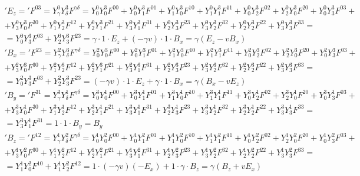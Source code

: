 \begin{gather*}
'E_z ='F^{03} = Y^0_\gamma Y^3_\delta F^{\gamma \delta} = Y^0_0 Y^3_0 F^{00}+Y^0_0 Y^3_1 F^{01}+Y^0_1 Y^3_0 F^{10}+Y^0_1 Y^3_1 F^{11}+Y^0_0 Y^3_2 F^{02}+Y^0_2 Y^3_0 F^{20}+Y^0_0 Y^3_3 F^{03}+\\+Y^0_3 Y^3_0 F^{30}+Y^0_1 Y^3_2 F^{12}+Y^0_2 Y^3_1 F^{21}+Y^0_3 Y^3_1 F^{31}+Y^0_2 Y^3_3 F^{23}+Y^0_3 Y^3_2 F^{32}+Y^0_2 Y^3_2 F^{22}+Y^0_3 Y^3_3 F^{33}=\\
=Y^0_0 Y^3_3 F^{03}+Y^0_2 Y^3_3 F^{23}=\gamma \cdot 1 \cdot E_z+(-\gamma v)\cdot 1 \cdot B_x = \gamma(E_z-vB_x)
\end{gather*}
\begin{gather*}
'B_x ='F^{23} = Y^2_\gamma Y^3_\delta F^{\gamma \delta} = Y^2_0 Y^3_0 F^{00}+Y^2_0 Y^3_1 F^{01}+Y^2_1 Y^3_0 F^{10}+Y^2_1 Y^3_1 F^{11}+Y^2_0 Y^3_2 F^{02}+Y^2_2 Y^3_0 F^{20}+Y^2_0 Y^3_3 F^{03}+\\+Y^2_3 Y^3_0 F^{30}+Y^2_1 Y^3_2 F^{12}+Y^2_2 Y^3_1 F^{21}+Y^2_3 Y^3_1 F^{31}+Y^2_2 Y^3_3 F^{23}+Y^2_3 Y^3_2 F^{32}+Y^2_2 Y^3_2 F^{22}+Y^2_3 Y^3_3 F^{33}=\\
=Y^2_0 Y^3_3 F^{03}+Y^2_2 Y^3_3 F^{23}=(-\gamma v)\cdot 1 \cdot E_z+\gamma \cdot 1 \cdot B_x=\gamma (B_x-vE_z)
\end{gather*}
\begin{gather*}
'B_y ='F^{31} = Y^3_\gamma Y^1_\delta F^{\gamma \delta} = Y^3_0 Y^1_0 F^{00}+Y^3_0 Y^1_1 F^{01}+Y^3_1 Y^1_0 F^{10}+Y^3_1 Y^1_1 F^{11}+Y^3_0 Y^1_2 F^{02}+Y^3_2 Y^1_0 F^{20}+Y^3_0 Y^1_3 F^{03}+\\+Y^3_3 Y^1_0 F^{30}+Y^3_1 Y^1_2 F^{12}+Y^3_2 Y^1_1 F^{21}+Y^3_3 Y^1_1 F^{31}+Y^3_2 Y^1_3 F^{23}+Y^3_3 Y^1_2 F^{32}+Y^3_2 Y^1_2 F^{22}+Y^3_3 Y^1_3 F^{33}=\\
=Y^3_3 Y^1_1 F^{31}=1\cdot 1 \cdot B_y= B_y
\end{gather*}
\begin{gather*}
'B_z ='F^{12} = Y^1_\gamma Y^2_\delta F^{\gamma \delta} = Y^1_0 Y^2_0 F^{00}+Y^1_0 Y^2_1 F^{01}+Y^1_1 Y^2_0 F^{10}+Y^1_1 Y^2_1 F^{11}+Y^1_0 Y^2_2 F^{02}+Y^1_2 Y^2_0 F^{20}+Y^1_0 Y^2_3 F^{03}+\\+Y^1_3 Y^2_0 F^{30}+Y^1_1 Y^2_2 F^{12}+Y^1_2 Y^2_1 F^{21}+Y^1_3 Y^2_1 F^{31}+Y^1_2 Y^2_3 F^{23}+Y^1_3 Y^2_2 F^{32}+Y^1_2 Y^2_2 F^{22}+Y^1_3 Y^2_3 F^{33}=\\
=Y^1_1 Y^2_0 F^{10}+Y^1_1 Y^2_2 F^{12} = 1\cdot (-\gamma v)(-E_x)+1\cdot \gamma \cdot B_z = \gamma (B_z+vE_x)
\end{gather*}
